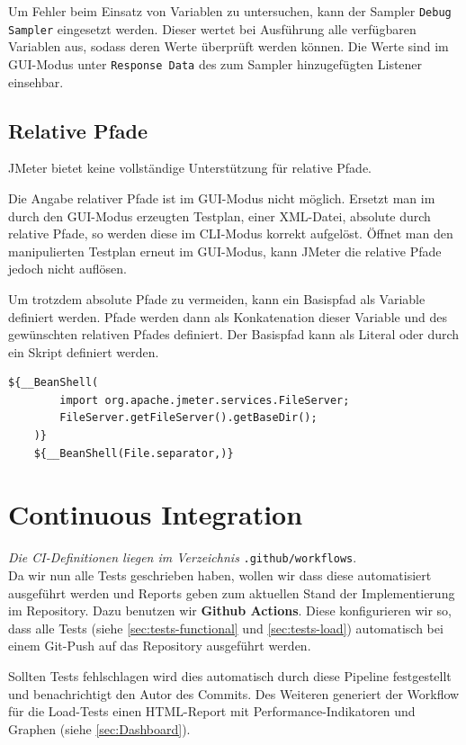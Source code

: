 Um Fehler beim Einsatz von Variablen zu untersuchen,
kann der Sampler \texttt{Debug Sampler} eingesetzt werden.
Dieser wertet bei Ausführung alle verfügbaren Variablen aus, sodass deren Werte überprüft werden können.
Die Werte sind im GUI-Modus unter \texttt{Response Data} des zum Sampler hinzugefügten Listener einsehbar.

\subsection{Relative Pfade}

JMeter bietet keine vollständige Unterstützung für relative Pfade.

Die Angabe relativer Pfade ist im GUI-Modus nicht möglich.
Ersetzt man im durch den GUI-Modus erzeugten Testplan, einer XML-Datei, absolute durch relative Pfade,
so werden diese im CLI-Modus korrekt aufgelöst.
Öffnet man den manipulierten Testplan erneut im GUI-Modus,
kann JMeter die relative Pfade jedoch nicht auflösen.

Um trotzdem absolute Pfade zu vermeiden, 
kann ein Basispfad als Variable definiert werden.
Pfade werden dann als Konkatenation dieser Variable und des gewünschten relativen Pfades definiert.
Der Basispfad kann als Literal oder durch ein Skript definiert werden.

\begin{lstlisting}[caption=Ermitteln des Working Directory\protect\footnotemark]
    ${__BeanShell(
        import org.apache.jmeter.services.FileServer; 
        FileServer.getFileServer().getBaseDir();
    )}
    ${__BeanShell(File.separator,)}
\end{lstlisting}

\section{Continuous Integration}

\textit{Die \ac{CI}-Definitionen liegen im Verzeichnis} \texttt{.github/workflows}.\\

Da wir nun alle Tests geschrieben haben, wollen wir dass diese automatisiert ausgeführt werden und Reports geben zum aktuellen Stand der Implementierung im Repository. Dazu benutzen wir \textbf{Github Actions}. Diese konfigurieren wir so, dass alle Tests (siehe \ref{sec:tests-functional} und \ref{sec:tests-load}) automatisch bei einem Git-Push auf das Repository ausgeführt werden.

Sollten Tests fehlschlagen wird dies automatisch durch diese Pipeline festgestellt und benachrichtigt den Autor des Commits.
Des Weiteren generiert der Workflow für die Load-Tests einen HTML-Report mit Performance-Indikatoren und Graphen (siehe \ref{sec:Dashboard}).
